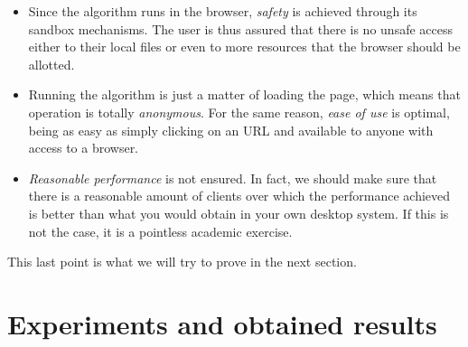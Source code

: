\documentclass[journal,onecolumn]{IEEEtran}
\begin{document}
\begin{itemize}
\item Since the algorithm runs in the browser, {\em safety} is
  achieved through its sandbox mechanisms. The user is thus assured
  that there is no unsafe access either to their local files or even
  to more resources that the browser should be allotted.
\item Running the algorithm is just a matter of loading the page,
  which means that operation is totally {\em anonymous}. For the same
  reason, {\em ease of use} is optimal, being as easy as simply
  clicking on an URL and available to anyone with access to a browser.
\item {\em Reasonable performance} is not ensured. In fact, we should
  make sure that there is a reasonable amount of clients over which
  the performance achieved is better than what you would obtain in
  your own desktop system. If this is not the case, it is a pointless
  academic exercise.
\end{itemize}

This last point is what we will try to prove in the next section.

\section{Experiments and obtained results}
\label{sec:experiments}
\end{document}
